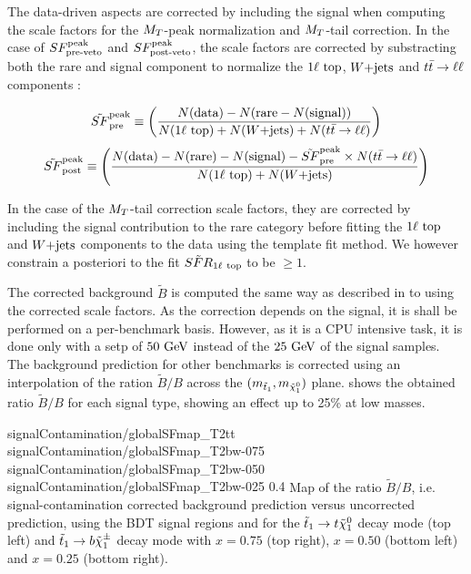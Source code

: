         The data-driven aspects are corrected by including the signal when computing the scale factors for the
        $M_T$-peak normalization and $M_T$-tail correction. In the case of $SF_{\text{pre-veto}}^{\text{peak}}$ and $SF_{\text{post-veto}}^{\text{peak}}$, the scale factors
        are corrected by substracting both the rare and signal component to normalize the $1\ell~\text{top}$, $\text{$W$+jets}$
        and $t\bar{t} \rightarrow \ell \ell$ components :

        \begin{equation}
            \tilde{SF}_{\text{pre}}^{\text{peak}} \equiv \left( \frac{N(\text{data}) - N(\text{rare} - N(\text{signal}))}{N(1\ell~\text{top}) + N(\text{$W$+jets}) + N(t\bar{t} \rightarrow \ell \ell)} \right)
        \end{equation}
        \begin{equation}
            \tilde{SF}_{\text{post}}^{\text{peak}} \equiv \left( \frac{N(\text{data}) - N(\text{rare}) - N(\text{signal}) - \tilde{SF}_{\text{pre}}^{\text{peak}} \times N(t\bar{t} \rightarrow \ell \ell)}{N(1\ell~\text{top}) + N(\text{$W$+jets})} \right)
        \end{equation}

        In the case of the $M_T$-tail correction scale factors, they are corrected by including the signal contribution
        to the rare category before fitting the $1\ell~\text{top}$ and $\text{$W$+jets}$ components to the data using the template
        fit method. We however constrain a posteriori to the fit $\tilde{SFR}_{1\ell~\text{top}}$ to be $\geq 1$.

        The corrected background $\tilde{B}$ is computed the same way as described in  to 
        using the corrected scale factors. As the correction depends on the signal, it is shall be performed on a per-benchmark
        basis. However, as it is a CPU intensive task, it is done only with a setp of $50 ~\text{GeV}$ instead of the $25 ~\text{GeV}$
        of the signal samples. The background prediction for other benchmarks is corrected using an interpolation of
        the ration $\tilde{B}/B$ across the $(m_{\tilde{t}_1},m_{\tilde{\chi}_1^0})$ plane.  shows
        the obtained ratio $\tilde{B}/B$ for each signal type, showing an effect up to 25\% at low masses.

                          {signalContamination/globalSFmap_T2tt}
                          {signalContamination/globalSFmap_T2bw-075}
                          {signalContamination/globalSFmap_T2bw-050}
                          {signalContamination/globalSFmap_T2bw-025}
                          {0.4}
                          {Map of the ratio $\tilde{B}/B$, i.e. signal-contamination corrected background prediction versus uncorrected prediction, using the BDT signal regions and for the $\tilde{t}_1 \rightarrow t \tilde{\chi}_1^0$ decay mode (top left) and $\tilde{t}_1 \rightarrow b \tilde{\chi}_1^\pm$ decay mode with $x=0.75$ (top right), $x=0.50$ (bottom left) and $x=0.25$ (bottom right).}

